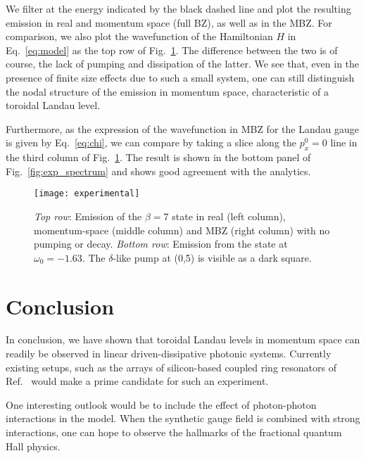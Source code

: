 \documentclass[twocolumn, 10pt, aps, superscriptaddress, floatfix, showpacs, pra, citeautoscript]{revtex4-1}
\newcommand{\co}[2]{#2}
\renewcommand{\paragraph}{\co}
\begin{document}

We filter at the energy indicated by the black dashed line and plot
the resulting emission in real and momentum space (full BZ), as well
as in the MBZ. For comparison, we also plot the wavefunction of the
Hamiltonian $H$ in Eq.~\eqref{eq:model} as the top row of
Fig.~\ref{fig:exp_states}. The difference between the two is of
course, the lack of pumping and dissipation of the latter. We see
that, even in the presence of finite size effects due to such a small
system, one can still distinguish the nodal structure of the emission
in momentum space, characteristic of a toroidal Landau level. 

Furthermore, as the expression of the wavefunction in MBZ for the
Landau gauge is given by Eq.~\eqref{eq:chi}, we can compare by taking
a slice along the $p_x^0 = 0$ line in the third column of
Fig.~\ref{fig:exp_states}. The result is shown in the bottom panel of
Fig.~\ref{fig:exp_spectrum} and shows good agreement with the
analytics.



\begin{figure}[htb]
  \centering
  \texttt{[image: experimental]}
  \caption{\emph{Top row}: Emission of the $\beta=7$ state in real
    (left column), momentum-space (middle column) and MBZ (right
    column) with no pumping or decay.
    \emph{Bottom row}: Emission from the state at $\omega_0 = -1.63$.
    The $\delta$-like pump at (0,5) is visible as a dark square.}
  \label{fig:exp_states}
\end{figure}

\section{Conclusion}
\label{sec:conclusion}


In conclusion, we have shown that toroidal Landau levels in momentum
space can readily be observed in linear driven-dissipative photonic
systems. Currently existing setups, such as the arrays of
silicon-based coupled ring resonators of
Ref.~ would make a prime candidate for
such an experiment.

\paragraph{One possible outlook is to include interactions.}
One interesting outlook would be to include the effect of photon-photon interactions in the model. When the synthetic gauge field is combined with strong interactions, one can hope to observe the hallmarks of the fractional quantum Hall physics.
\end{document}
